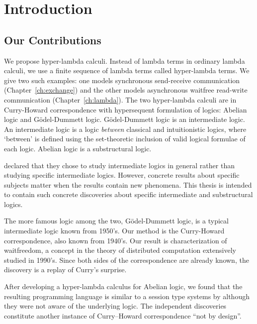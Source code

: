 \chapter{Introduction}

\section{Our Contributions}

We propose hyper-lambda calculi.
Instead of lambda terms in ordinary lambda calculi,
we use a finite sequence of lambda terms called hyper-lambda terms.
We give two such examples:
one models synchronous send-receive communication (Chapter~\ref{ch:exchange}) and
the other models asynchronous waitfree
read-write communication (Chapter~\ref{ch:lambda}).
The two hyper-lambda calculi are in Curry-Howard correspondence with
hypersequent formulation of logics: Abelian logic and G\"odel-Dummett
logic.
G\"odel-Dummett logic is an intermediate logic.
An intermediate logic is a logic \textit{between} classical and
intuitionistic logics, where `between' is defined using the
set-theoretic inclusion of valid logical formulae of each logic.
Abelian logic is a substructural logic.

\citet{hosoi-ono} declared that they chose to study intermediate
logics in
general rather than studying specific intermediate logics.
However, concrete results about specific subjects matter when the
results contain new phenomena.
This thesis is intended to contain such concrete discoveries
about specific intermediate and substructural logics.

The more famous logic among the two, G\"odel-Dummett logic, is
a typical intermediate logic known from 1950's.
Our method is the Curry-Howard correspondence, also known from 1940's.
Our result is characterization of waitfreedom, a concept in the theory
of distributed computation extensively studied in 1990's.
Since both sides of the correspondence are already known,
the discovery is a replay of Curry's surprise.

After developing a hyper-lambda calculus for Abelian logic,
we found that the resulting programming language is similar to a
session type systems by \citet{giunti2010} although they were not aware
of the underlying logic.  The independent discoveries constitute
another instance of Curry--Howard correspondence ``not by design''.

